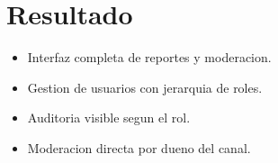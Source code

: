 \section{Resultado}

\begin{exito}
\begin{itemize}[leftmargin=*]
  \item Interfaz completa de reportes y moderacion.
  \item Gestion de usuarios con jerarquia de roles.
  \item Auditoria visible segun el rol.
  \item Moderacion directa por dueno del canal.
\end{itemize}
\end{exito}